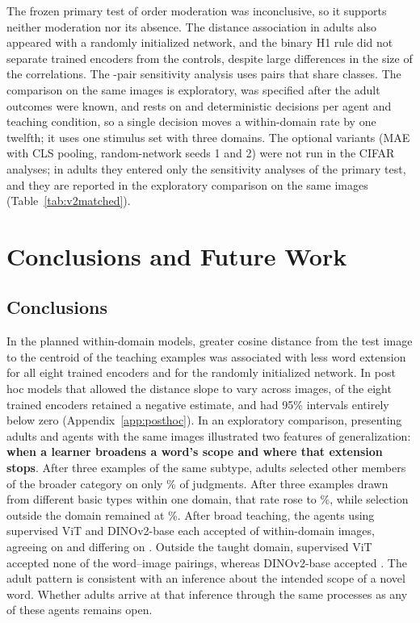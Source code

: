 \documentclass[11pt]{article}
\begin{document}
The frozen primary test of order moderation was inconclusive, so it supports neither moderation nor its absence. The distance association in adults also appeared with a randomly initialized network, and the binary H1 rule did not separate trained encoders from the controls, despite large differences in the size of the correlations. The \VtDallN-pair sensitivity analysis uses pairs that share classes. The comparison on the same images is exploratory, was specified after the adult outcomes were known, and rests on \VtXInN{} and \VtXOutN{} deterministic decisions per agent and teaching condition, so a single decision moves a within-domain rate by one twelfth; it uses one stimulus set with three domains. The optional variants (MAE with CLS pooling, random-network seeds 1 and 2) were not run in the CIFAR analyses; in adults they entered only the sensitivity analyses of the primary test, and they are reported in the exploratory comparison on the same images (Table~\ref{tab:v2matched}).


\section{Conclusions and Future Work}

\subsection{Conclusions}

In the planned within-domain models, greater cosine distance from the test image to the centroid of the teaching examples was associated with less word extension for all eight trained encoders and for the randomly initialized network. In post hoc models that allowed the distance slope to vary across images, \VcImgTrSameSignWord{} of the eight trained encoders retained a negative estimate, and \VcImgTrExclWord{} had 95\% intervals entirely below zero (Appendix~\ref{app:posthoc}). In an exploratory comparison, presenting adults and agents with the same images illustrated two features of generalization: \textbf{when a learner broadens a word’s scope and where that extension stops}. After three examples of the same subtype, adults selected other members of the broader category on only \VcXSameSubPct\% of judgments. After three examples drawn from different basic types within one domain, that rate rose to \VtXBroadPct\%, while selection outside the domain remained at \VtXOutBroadPct\%. After broad teaching, the agents using supervised ViT and DINOv2-base each accepted \VtXViTIn{} of \VtXInN{} within-domain images, agreeing on \VdAgreeWord{} and differing on \VdDifferWord. Outside the taught domain, supervised ViT accepted none of the \VtXOutN{} word--image pairings, whereas DINOv2-base accepted \VtXDinoBOut. The adult pattern is consistent with an inference about the intended scope of a novel word. Whether adults arrive at that inference through the same processes as any of these agents remains open.
\end{document}
